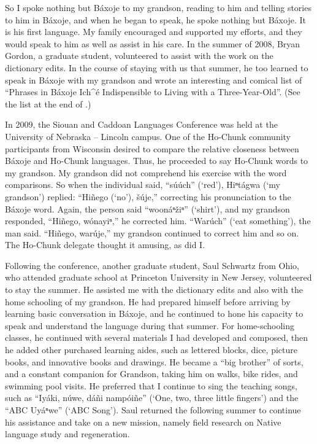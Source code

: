\documentclass[output=paper]{LSP/langsci}
\begin{document}
So I spoke nothing but Báxoje to my grandson, reading to him and telling stories to him in Báxoje, and when he began to speak, he spoke nothing but Báxoje. It is his first language. My family encouraged and supported my efforts, and they would speak to him as well as assist in his care. In the summer of 2008, Bryan Gordon, a graduate student, volunteered to assist with the work on the dictionary edits. In the course of staying with us that summer, he too learned to speak in Báxoje with my grandson and wrote an interesting and comical list of ``Phrases in Báxoje Ich\^{ }é Indispensible to Living with a Three-Year-Old''. (See the list at the end of .)

In 2009, the Siouan and Caddoan Languages Conference was held at the University of Nebraska -- Lincoln campus. One of the Ho-Chunk community participants from Wisconsin desired to compare the relative closeness between Báxoje and Ho-Chunk languages. Thus, he proceeded to say Ho-Chunk words to my grandson. My grandson did not comprehend his exercise with the word comparisons. So when the individual said, ``súúch'' (`red'), Hiⁿtágwa (`my grandson') replied: ``Hiñego (`no'), šúje,'' correcting his pronunciation to the Báxoje word. Again, the person said ``woonáⁿ\v{z}iⁿ'' (`shirt'), and my grandson responded, ``Hiñego, wónayiⁿ,'' he corrected him. ``Warúch'' (`eat something'), the man said. ``Hiñego, warúje,'' my grandson continued to correct him and so on. The Ho-Chunk delegate thought it amusing, as did I.

Following the conference, another graduate student, Saul Schwartz from Ohio, who attended graduate school at Princeton University in New Jersey, volunteered to stay the summer. He assisted me with the dictionary edits and also with the home schooling of my grandson. He had prepared himself before arriving by learning basic conversation in Báxoje, and he continued to hone his capacity to speak and understand the language during that summer. For home-schooling classes, he continued with several materials I had developed and composed, then he added other purchased learning aides, such as lettered blocks, dice, picture books, and innovative books and drawings. He became a ``big brother'' of sorts, and a constant companion for Grandson, taking him on walks, bike rides, and swimming pool visits. He preferred that I continue to sing the teaching songs, such as ``Iyáki, núwe, dáñi nampóiñe'' (`One, two, three little fingers') and the ``ABC Uyáⁿwe'' (`ABC Song'). Saul returned the following summer to continue his assistance and take on a new mission, namely field research on Native language study and regeneration.  
\end{document}
